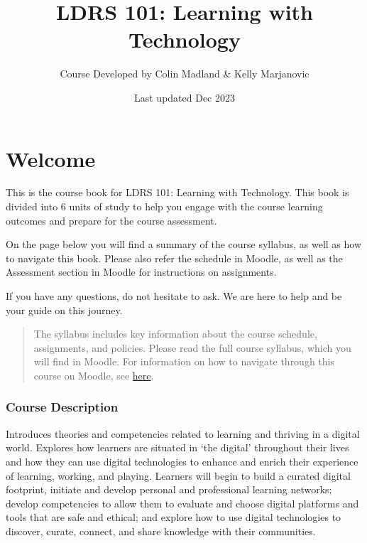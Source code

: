 \documentclass[
]{book}
\title{LDRS 101: Learning with Technology}
\author{Course Developed by Colin Madland \& Kelly Marjanovic}
\date{Last updated Dec 2023}
\theoremstyle{definition}
\theoremstyle{definition}
\theoremstyle{definition}
\theoremstyle{definition}
\theoremstyle{remark}
\begin{document}
\maketitle

{
\setcounter{tocdepth}{1}
\tableofcontents
}
\hypertarget{welcome}{%
\chapter*{Welcome}\label{welcome}}

This is the course book for LDRS 101: Learning with Technology. This book is divided into 6 units of study to help you engage with the course learning outcomes and prepare for the course assessment.

On the page below you will find a summary of the course syllabus, as well as how to navigate this book. Please also refer the schedule in Moodle, as well as the Assessment section in Moodle for instructions on assignments.

If you have any questions, do not hesitate to ask. We are here to help and be your guide on this journey.

\begin{quote}
The syllabus includes key information about the course schedule, assignments, and policies. Please read the full course syllabus, which you will find in Moodle. For information on how to navigate through this course on Moodle, see \href{https://trinitywestern.teamdynamix.com/TDClient/1904/Portal/KB/?CategoryID=8214}{here}.
\end{quote}

\hypertarget{course-description}{%
\subsection*{Course Description}\label{course-description}}

Introduces theories and competencies related to learning and thriving in a digital world. Explores how learners are situated in `the digital' throughout their lives and how they can use digital technologies to enhance and enrich their experience of learning, working, and playing. Learners will begin to build a curated digital footprint, initiate and develop personal and professional learning networks; develop competencies to allow them to evaluate and choose digital platforms and tools that are safe and ethical; and explore how to use digital technologies to discover, curate, connect, and share knowledge with their communities.
\end{document}
